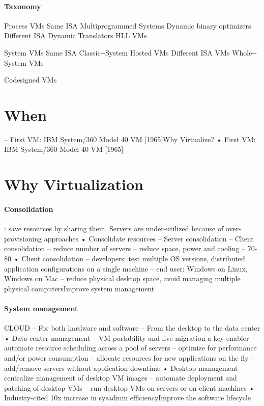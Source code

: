 \documentclass[10pt]{article}
\begin{document}
\paragraph{Taxonomy}

Process	VMs	
	Same ISA	
		Multiprogrammed	Systems	
		Dynamic	binary optimizers
	Different	 ISA	
		Dynamic	Translators
		HLL	 VMs	
 	 
System	VMs	
    Same ISA	
    	Classic-­‐System
    	Hosted VMs	
  	Different ISA VMs	
   		Whole-­‐System VMs	
   		
   		Codesigned VMs
  
\section{When}

–  First VM: IBM System/360 Model 40 VM [1965]Why Virtualize?
• First VM: IBM System/360 Model 40 VM [1965]

\section{Why Virtualization}

\paragraph{Consolidation}:
save resources by sharing them. Servers are under-utilized
because of over-provisioning approaches
•  Consolidate resources
–  Server consolidation
–  Client consolidation
–  reduce number of servers
–  reduce space, power and cooling
–  70-80%
•  Client consolidation
–  developers: test multiple OS versions, distributed
application configurations on a single machine
–  end user: Windows on Linux, Windows on Mac
–  reduce physical desktop space, avoid managing
multiple physical computersImprove system management


\paragraph{System management} 
CLOUD
–  For both hardware and software
–  From the desktop to the data center
•  Data center management
–  VM portability and live migration a key enabler
–  automate resource scheduling across a pool of
servers
–  optimize for performance and/or power consumption
–  allocate resources for new applications on the fly
–  add/remove servers without application downtime
•  Desktop management
–  centralize management of desktop VM images
–  automate deployment and patching of desktop VMs
–  run desktop VMs on servers or on client machines
•  Industry-cited 10x increase in sysadmin
efficiencyImprove the software lifecycle
\end{document}
